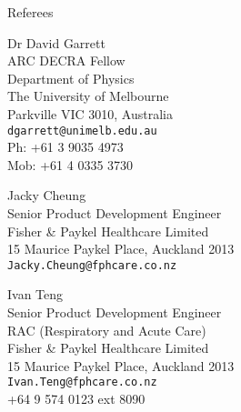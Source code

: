 \documentclass[11pt]{tracv}
\begin{document}
\begin{columnsection}{Referees}

\begin{multicols}{2}

	Dr David Garrett\\
	ARC DECRA Fellow\\
	Department of Physics\\
	The University of Melbourne\\
	Parkville VIC 3010, Australia\\
	\texttt{dgarrett@unimelb.edu.au}\\
	Ph: +61 3 9035 4973\\
	Mob: +61 4 0335 3730\\

	\vspace{0.25cm}

    	Jacky Cheung\\
	Senior Product Development Engineer\\ 
	Fisher \& Paykel Healthcare Limited\\
	15 Maurice Paykel Place, Auckland 2013\\ 
	\texttt{Jacky.Cheung@fphcare.co.nz}\\

	\vspace{0.25cm}
	\columnbreak

	Ivan Teng\\
	Senior Product Development Engineer\\
	RAC (Respiratory and Acute Care)\\
	Fisher \& Paykel Healthcare Limited\\
	15 Maurice Paykel Place, Auckland 2013\\
	\texttt{Ivan.Teng@fphcare.co.nz}\\
	+64 9 574 0123 ext 8090\\

\end{multicols}

\end{columnsection}
\end{document}
